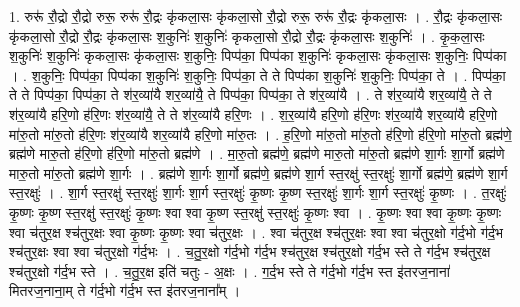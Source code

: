 \documentclass[17pt]{extarticle}
\begin{document}
1. रुरू॑ रौ॒द्रो रौ॒द्रो रुरू॒ रुरू॑ रौ॒द्रः कृ॑कला॒सः कृ॑कला॒सो रौ॒द्रो रुरू॒ रुरू॑ रौ॒द्रः कृ॑कला॒सः । . रौ॒द्रः कृ॑कला॒सः कृ॑कला॒सो रौ॒द्रो रौ॒द्रः कृ॑कला॒सः श॒कुनिः॑ श॒कुनिः॑ कृकला॒सो रौ॒द्रो रौ॒द्रः कृ॑कला॒सः श॒कुनिः॑ । . कृ॒क॒ला॒सः श॒कुनिः॑ श॒कुनिः॑ कृकला॒सः कृ॑कला॒सः श॒कुनिः॒ पिप्प॑का॒ पिप्प॑का श॒कुनिः॑ कृकला॒सः कृ॑कला॒सः श॒कुनिः॒ पिप्प॑का । . श॒कुनिः॒ पिप्प॑का॒ पिप्प॑का श॒कुनिः॑ श॒कुनिः॒ पिप्प॑का॒ ते ते पिप्प॑का श॒कुनिः॑ श॒कुनिः॒ पिप्प॑का॒ ते । . पिप्प॑का॒ ते ते पिप्प॑का॒ पिप्प॑का॒ ते श॑र॒व्या॑यै शर॒व्या॑यै॒ ते पिप्प॑का॒ पिप्प॑का॒ ते श॑र॒व्या॑यै । . ते श॑र॒व्या॑यै शर॒व्या॑यै॒ ते ते श॑र॒व्या॑यै हरि॒णो ह॑रि॒णः श॑र॒व्या॑यै॒ ते ते श॑र॒व्या॑यै हरि॒णः । . श॒र॒व्या॑यै हरि॒णो ह॑रि॒णः श॑र॒व्या॑यै शर॒व्या॑यै हरि॒णो मा॑रु॒तो मा॑रु॒तो ह॑रि॒णः श॑र॒व्या॑यै शर॒व्या॑यै हरि॒णो मा॑रु॒तः । . ह॒रि॒णो मा॑रु॒तो मा॑रु॒तो ह॑रि॒णो ह॑रि॒णो मा॑रु॒तो ब्रह्म॑णे॒ ब्रह्म॑णे मारु॒तो ह॑रि॒णो ह॑रि॒णो मा॑रु॒तो ब्रह्म॑णे । . मा॒रु॒तो ब्रह्म॑णे॒ ब्रह्म॑णे मारु॒तो मा॑रु॒तो ब्रह्म॑णे शा॒र्गः शा॒र्गो ब्रह्म॑णे मारु॒तो मा॑रु॒तो ब्रह्म॑णे शा॒र्गः । . ब्रह्म॑णे शा॒र्गः शा॒र्गो ब्रह्म॑णे॒ ब्रह्म॑णे शा॒र्ग स्त॒रक्षु॑ स्त॒रक्षुः॑ शा॒र्गो ब्रह्म॑णे॒ ब्रह्म॑णे शा॒र्ग स्त॒रक्षुः॑ । . शा॒र्ग स्त॒रक्षु॑ स्त॒रक्षुः॑ शा॒र्गः शा॒र्ग स्त॒रक्षुः॑ कृ॒ष्णः कृ॒ष्ण स्त॒रक्षुः॑ शा॒र्गः शा॒र्ग स्त॒रक्षुः॑ कृ॒ष्णः । . त॒रक्षुः॑ कृ॒ष्णः कृ॒ष्ण स्त॒रक्षु॑ स्त॒रक्षुः॑ कृ॒ष्णः श्वा श्वा कृ॒ष्ण स्त॒रक्षु॑ स्त॒रक्षुः॑ कृ॒ष्णः श्वा । . कृ॒ष्णः श्वा श्वा कृ॒ष्णः कृ॒ष्णः श्वा च॑तुर॒क्ष श्च॑तुर॒क्षः श्वा कृ॒ष्णः कृ॒ष्णः श्वा च॑तुर॒क्षः । . श्वा च॑तुर॒क्ष श्च॑तुर॒क्षः श्वा श्वा च॑तुर॒क्षो ग॑र्द॒भो ग॑र्द॒भ श्च॑तुर॒क्षः श्वा श्वा च॑तुर॒क्षो ग॑र्द॒भः । . च॒तु॒र॒क्षो ग॑र्द॒भो ग॑र्द॒भ श्च॑तुर॒क्ष श्च॑तुर॒क्षो ग॑र्द॒भ स्ते ते ग॑र्द॒भ श्च॑तुर॒क्ष श्च॑तुर॒क्षो ग॑र्द॒भ स्ते । . च॒तु॒र॒क्ष इति॑ चतुः - अ॒क्षः । . ग॒र्द॒भ स्ते ते ग॑र्द॒भो ग॑र्द॒भ स्त इ॑तरज॒नाना॑ मितरज॒नाना॒म् ते ग॑र्द॒भो ग॑र्द॒भ स्त इ॑तरज॒नाना᳚म् । \newline
\end{document}
